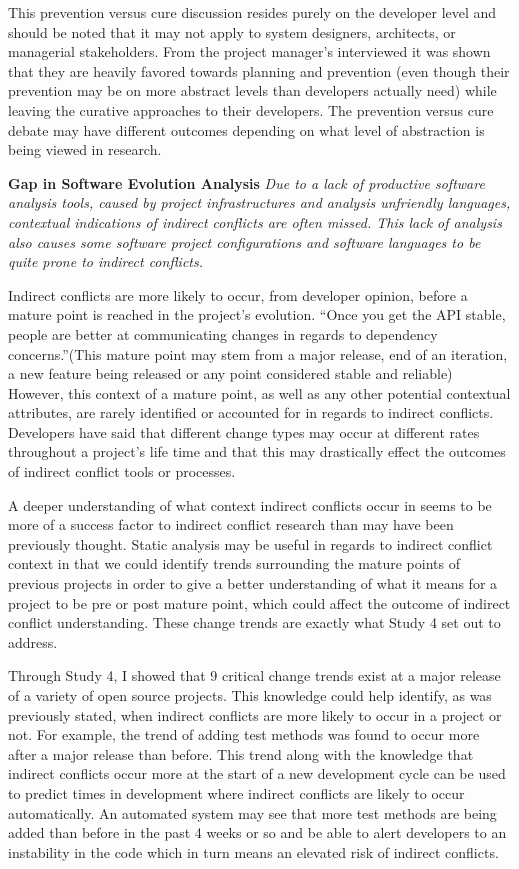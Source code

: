 This prevention versus cure discussion resides purely on the developer level and should be noted that it may not apply to system
designers, architects, or managerial stakeholders. 
From the project manager's interviewed it was shown that they are heavily favored towards planning and 
prevention (even though their prevention may be on more abstract levels than developers actually need) while leaving the curative
approaches to their developers. The prevention versus cure debate may have different outcomes depending on what level of abstraction
is being viewed in research.

\textbf{Gap in Software Evolution Analysis} \textit{Due to a lack of productive software analysis tools, caused by project infrastructures
and analysis unfriendly languages, contextual indications of indirect conflicts are often missed. This lack of analysis also causes
some software project configurations and software languages to be quite prone to indirect conflicts.}

Indirect conflicts are more likely to occur,
from developer opinion, before a mature point is reached in the project's evolution. ``Once you get the API stable, people are 
better at communicating changes in regards to dependency concerns.''(This mature point may stem from a major release,
end of an iteration, a new feature being released or any point considered stable and reliable) However, this context of a 
mature point, as well as any other
potential contextual attributes, are rarely identified or accounted for in regards to indirect conflicts. Developers have said
that different change types may occur at different rates throughout a project's life time and that this
may drastically effect the outcomes of indirect conflict tools or processes.

A deeper understanding of what context indirect conflicts occur in seems to be more of a success factor to indirect conflict
research than may have been previously thought. Static analysis may be useful in regards to indirect conflict context in that we
could identify trends surrounding the mature points of previous projects in order to give a better understanding of what it
means for a project to be pre or post mature point, which could affect the outcome of indirect conflict understanding.
These change trends are exactly what Study 4 set out to address.

Through Study 4, I showed that 9 critical change trends exist at a major release of a variety of open source projects. This
knowledge could help identify, as was previously stated, when indirect conflicts are more likely to occur in a project or not.
For example, the trend of adding test methods was found to occur more after a major release than before. This trend along with
the knowledge that indirect conflicts occur more at the start of a new development cycle can be used to predict times in development
where indirect conflicts are likely to occur automatically. An automated system may see that more test methods are being added than
before in the past 4 weeks or so and be able to alert developers to an instability in the code which in turn means an elevated
risk of indirect conflicts.

